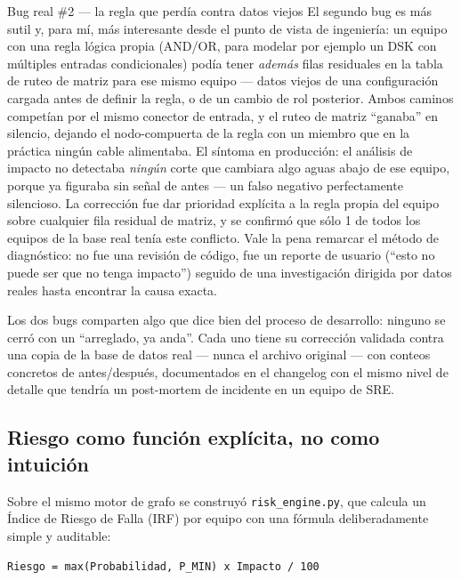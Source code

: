 \documentclass[11pt,twocolumn]{article}
\begin{document}
\begin{bugbox}{Bug real \#2 --- la regla que perdía contra datos viejos}
El segundo bug es más sutil y, para mí, más interesante desde el punto de vista de ingeniería: un equipo con una regla lógica propia (AND/OR, para modelar por ejemplo un DSK con múltiples entradas condicionales) podía tener \emph{además} filas residuales en la tabla de ruteo de matriz para ese mismo equipo --- datos viejos de una configuración cargada antes de definir la regla, o de un cambio de rol posterior. Ambos caminos competían por el mismo conector de entrada, y el ruteo de matriz ``ganaba'' en silencio, dejando el nodo-compuerta de la regla con un miembro que en la práctica ningún cable alimentaba. El síntoma en producción: el análisis de impacto no detectaba \emph{ningún} corte que cambiara algo aguas abajo de ese equipo, porque ya figuraba sin señal de antes --- un falso negativo perfectamente silencioso. La corrección fue dar prioridad explícita a la regla propia del equipo sobre cualquier fila residual de matriz, y se confirmó que sólo 1 de todos los equipos de la base real tenía este conflicto. Vale la pena remarcar el método de diagnóstico: no fue una revisión de código, fue un reporte de usuario (``esto no puede ser que no tenga impacto'') seguido de una investigación dirigida por datos reales hasta encontrar la causa exacta.
\end{bugbox}

Los dos bugs comparten algo que dice bien del proceso de desarrollo: ninguno se cerró con un ``arreglado, ya anda''. Cada uno tiene su corrección validada contra una copia de la base de datos real --- nunca el archivo original --- con conteos concretos de antes/después, documentados en el changelog con el mismo nivel de detalle que tendría un post-mortem de incidente en un equipo de SRE.

\subsection{Riesgo como función explícita, no como intuición}

Sobre el mismo motor de grafo se construyó \texttt{risk\_engine.py}, que calcula un Índice de Riesgo de Falla (IRF) por equipo con una fórmula deliberadamente simple y auditable:

\begin{lstlisting}[language={},numbers=none]
Riesgo = max(Probabilidad, P_MIN) x Impacto / 100
\end{lstlisting}
\end{document}
